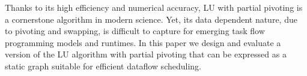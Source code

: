Thanks to its high efficiency and numerical accuracy, LU with partial
pivoting is a cornerstone algorithm in modern science. Yet, its data
dependent nature, due to pivoting and swapping, is difficult to capture
for emerging task flow programming models and runtimes. In this paper we
design and evaluate a version of the LU algorithm with partial pivoting
that can be expressed as a static graph suitable for efficient dataflow
scheduling.
